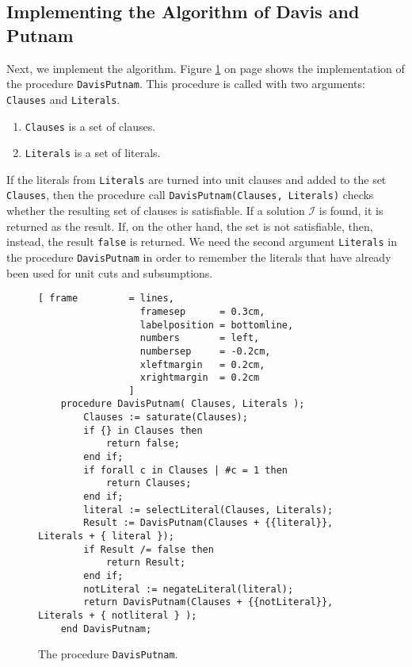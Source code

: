 \subsection{Implementing the  Algorithm of Davis and Putnam}
Next, we implement the algorithm.
Figure \ref{fig:solve} on page \pageref{fig:solve} shows the implementation of the
procedure \texttt{DavisPutnam}.  This procedure is called with two arguments: 
\texttt{Clauses} and \texttt{Literals}.
\begin{enumerate}
\item \texttt{Clauses} is a set of clauses.
\item \texttt{Literals} is a set of literals.
\end{enumerate}
If the literals from \texttt{Literals} are turned into unit clauses and added to the set \texttt{Clauses},
then the procedure call \texttt{DavisPutnam(Clauses, Literals)} checks whether the
resulting set of clauses is satisfiable.  If a solution $\mathcal{I}$ is
found, it is returned as the result.  If, on the other hand, the set is not
satisfiable, then, instead, the result \texttt{false} is returned.
We need the second argument \texttt{Literals} in the procedure \texttt{DavisPutnam} in
order to remember the literals that have already been used for unit cuts and subsumptions.

\begin{figure}[!ht]
  \centering
\begin{Verbatim}[ frame         = lines, 
                  framesep      = 0.3cm, 
                  labelposition = bottomline,
                  numbers       = left,
                  numbersep     = -0.2cm,
                  xleftmargin   = 0.2cm,
                  xrightmargin  = 0.2cm
                ]
    procedure DavisPutnam( Clauses, Literals );
        Clauses := saturate(Clauses);
        if {} in Clauses then
            return false;
        end if;
        if forall c in Clauses | #c = 1 then
            return Clauses;
        end if;
        literal := selectLiteral(Clauses, Literals);
        Result := DavisPutnam(Clauses + {{literal}}, Literals + { literal });
        if Result /= false then
            return Result;
        end if;        
        notLiteral := negateLiteral(literal);
        return DavisPutnam(Clauses + {{notLiteral}}, Literals + { notliteral } );
    end DavisPutnam;
\end{Verbatim}
\vspace*{-0.3cm}
  \caption{The procedure \texttt{DavisPutnam}.}
  \label{fig:solve}
\end{figure} 

